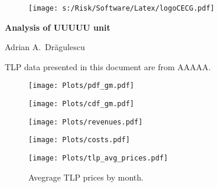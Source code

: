 \documentclass[letterpaper,12pt]{article}
\newcommand{\unitname}{UUUUU }
\newcommand{\asofdate}{AAAAA}
\begin{document}
\begin{figure}
\texttt{[image: s:/Risk/Software/Latex/logoCECG.pdf]}
\hfill
{}
\end{figure}

\vspace*{0.5in}
\begin{center}
\LARGE\bf{Analysis of \unitname unit}
\end{center}
\begin{center}
   Adrian A.\ Dr\u{a}gulescu
\end{center}
\begin{center}
  \small{TLP data presented in this document are from \asofdate.}
\end{center}
\vspace*{1in}


\clearpage
\begin{figure}
  \centerline{\texttt{[image: Plots/pdf\_gm.pdf]}}
\end{figure}
\begin{figure}
  \centerline{\texttt{[image: Plots/cdf\_gm.pdf]}}
\end{figure}


\clearpage
\begin{figure}
  \centerline{\texttt{[image: Plots/revenues.pdf]}}
\end{figure}

\clearpage
\begin{figure}
  \centerline{\texttt{[image: Plots/costs.pdf]}}
\end{figure}


\clearpage
\begin{figure}
  \centerline{\texttt{[image: Plots/tlp\_avg\_prices.pdf]}}
  \caption{Avegrage TLP prices by month.}
\end{figure}
%

\end{document}
